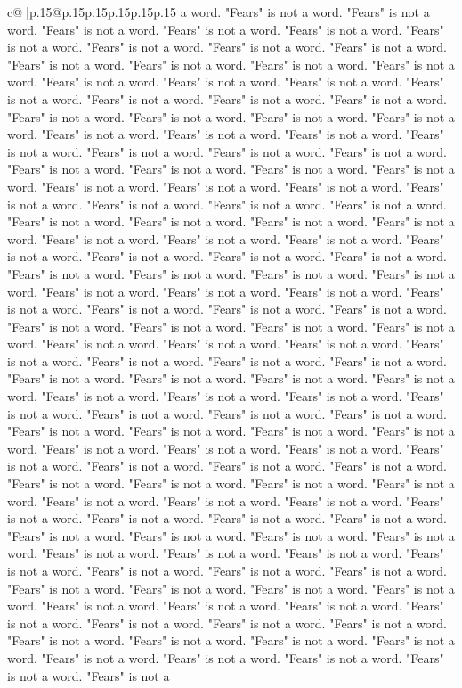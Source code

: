 \documentclass{article}
\begin{document}
{\begin{supertabular}{c@{$\;$}|p{.15\linewidth}@{}p{.15\linewidth}p{.15\linewidth}p{.15\linewidth}p{.15\linewidth}p{.15\linewidth}}
{{{a word. "Fears" is not a word. "Fears" is not a word. "Fears" is not a word. "Fears" is not a word. "Fears" is not a word. "Fears" is not a word. "Fears" is not a word. "Fears" is not a word. "Fears" is not a word. "Fears" is not a word. "Fears" is not a word. "Fears" is not a word. "Fears" is not a word. "Fears" is not a word. "Fears" is not a word. "Fears" is not a word. "Fears" is not a word. "Fears" is not a word. "Fears" is not a word. "Fears" is not a word. "Fears" is not a word. "Fears" is not a word. "Fears" is not a word. "Fears" is not a word. "Fears" is not a word. "Fears" is not a word. "Fears" is not a word. "Fears" is not a word. "Fears" is not a word. "Fears" is not a word. "Fears" is not a word. "Fears" is not a word. "Fears" is not a word. "Fears" is not a word. "Fears" is not a word. "Fears" is not a word. "Fears" is not a word. "Fears" is not a word. "Fears" is not a word. "Fears" is not a word. "Fears" is not a word. "Fears" is not a word. "Fears" is not a word. "Fears" is not a word. "Fears" is not a word. "Fears" is not a word. "Fears" is not a word. "Fears" is not a word. "Fears" is not a word. "Fears" is not a word. "Fears" is not a word. "Fears" is not a word. "Fears" is not a word. "Fears" is not a word. "Fears" is not a word. "Fears" is not a word. "Fears" is not a word. "Fears" is not a word. "Fears" is not a word. "Fears" is not a word. "Fears" is not a word. "Fears" is not a word. "Fears" is not a word. "Fears" is not a word. "Fears" is not a word. "Fears" is not a word. "Fears" is not a word. "Fears" is not a word. "Fears" is not a word. "Fears" is not a word. "Fears" is not a word. "Fears" is not a word. "Fears" is not a word. "Fears" is not a word. "Fears" is not a word. "Fears" is not a word. "Fears" is not a word. "Fears" is not a word. "Fears" is not a word. "Fears" is not a word. "Fears" is not a word. "Fears" is not a word. "Fears" is not a word. "Fears" is not a word. "Fears" is not a word. "Fears" is not a word. "Fears" is not a word. "Fears" is not a word. "Fears" is not a word. "Fears" is not a word. "Fears" is not a word. "Fears" is not a word. "Fears" is not a word. "Fears" is not a word. "Fears" is not a word. "Fears" is not a word. "Fears" is not a word. "Fears" is not a word. "Fears" is not a word. "Fears" is not a word. "Fears" is not a word. "Fears" is not a word. "Fears" is not a word. "Fears" is not a word. "Fears" is not a word. "Fears" is not a word. "Fears" is not a word. "Fears" is not a word. "Fears" is not a word. "Fears" is not a word. "Fears" is not a word. "Fears" is not a word. "Fears" is not a word. "Fears" is not a word. "Fears" is not a word. "Fears" is not a word. "Fears" is not a word. "Fears" is not a word. "Fears" is not a word. "Fears" is not a word. "Fears" is not a word. "Fears" is not a word. "Fears" is not a word. "Fears" is not a word. "Fears" is not a word. "Fears" is not a word. "Fears" is not a word. "Fears" is not a word. "Fears" is not a word. "Fears" is not a word. "Fears" is not a word. "Fears" is not a word. "Fears" is not a word. "Fears" is not a word. "Fears" is not a word. "Fears" is not a word. "Fears" is not a word. "Fears" is not a word. "Fears" is not a }}}
\end{supertabular}}
\end{document}
